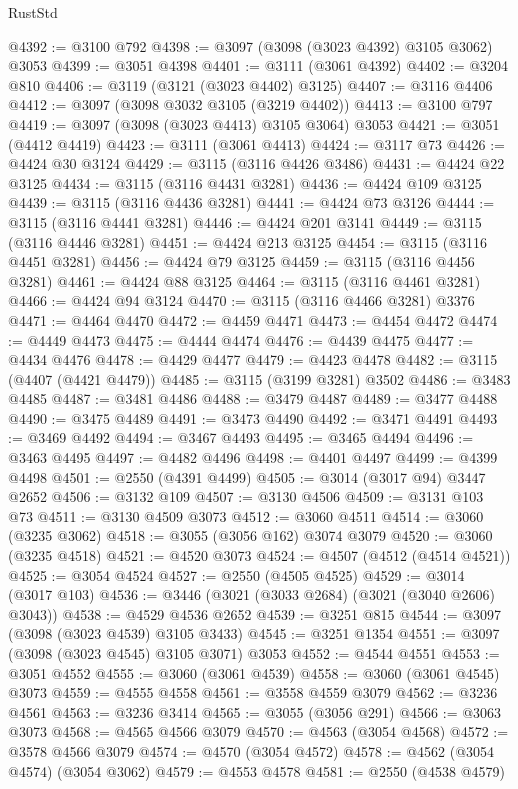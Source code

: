 \begin{lexlean}{RustStd}
\begin{coremodule}
{\begin{coremodule}
{{{{{{{{{{{{{{{{{{{{{{{{{{{{{{{{@4392 := @3100 @792
@4398 := @3097 (@3098 (@3023 @4392) @3105 @3062) @3053
@4399 := @3051 @4398
@4401 := @3111 (@3061 @4392)
@4402 := @3204 @810
@4406 := @3119 (@3121 (@3023 @4402) @3125)
@4407 := @3116 @4406
@4412 := @3097 (@3098 @3032 @3105 (@3219 @4402))
@4413 := @3100 @797
@4419 := @3097 (@3098 (@3023 @4413) @3105 @3064) @3053
@4421 := @3051 (@4412 @4419)
@4423 := @3111 (@3061 @4413)
@4424 := @3117 @73
@4426 := @4424 @30 @3124
@4429 := @3115 (@3116 @4426 @3486)
@4431 := @4424 @22 @3125
@4434 := @3115 (@3116 @4431 @3281)
@4436 := @4424 @109 @3125
@4439 := @3115 (@3116 @4436 @3281)
@4441 := @4424 @73 @3126
@4444 := @3115 (@3116 @4441 @3281)
@4446 := @4424 @201 @3141
@4449 := @3115 (@3116 @4446 @3281)
@4451 := @4424 @213 @3125
@4454 := @3115 (@3116 @4451 @3281)
@4456 := @4424 @79 @3125
@4459 := @3115 (@3116 @4456 @3281)
@4461 := @4424 @88 @3125
@4464 := @3115 (@3116 @4461 @3281)
@4466 := @4424 @94 @3124
@4470 := @3115 (@3116 @4466 @3281) @3376
@4471 := @4464 @4470
@4472 := @4459 @4471
@4473 := @4454 @4472
@4474 := @4449 @4473
@4475 := @4444 @4474
@4476 := @4439 @4475
@4477 := @4434 @4476
@4478 := @4429 @4477
@4479 := @4423 @4478
@4482 := @3115 (@4407 (@4421 @4479))
@4485 := @3115 (@3199 @3281) @3502
@4486 := @3483 @4485
@4487 := @3481 @4486
@4488 := @3479 @4487
@4489 := @3477 @4488
@4490 := @3475 @4489
@4491 := @3473 @4490
@4492 := @3471 @4491
@4493 := @3469 @4492
@4494 := @3467 @4493
@4495 := @3465 @4494
@4496 := @3463 @4495
@4497 := @4482 @4496
@4498 := @4401 @4497
@4499 := @4399 @4498
@4501 := @2550 (@4391 @4499)
@4505 := @3014 (@3017 @94) @3447 @2652
@4506 := @3132 @109
@4507 := @3130 @4506
@4509 := @3131 @103 @73
@4511 := @3130 @4509 @3073
@4512 := @3060 @4511
@4514 := @3060 (@3235 @3062)
@4518 := @3055 (@3056 @162) @3074 @3079
@4520 := @3060 (@3235 @4518)
@4521 := @4520 @3073
@4524 := @4507 (@4512 (@4514 @4521))
@4525 := @3054 @4524
@4527 := @2550 (@4505 @4525)
@4529 := @3014 (@3017 @103)
@4536 := @3446 (@3021 (@3033 @2684) (@3021 (@3040 @2606) @3043))
@4538 := @4529 @4536 @2652
@4539 := @3251 @815
@4544 := @3097 (@3098 (@3023 @4539) @3105 @3433)
@4545 := @3251 @1354
@4551 := @3097 (@3098 (@3023 @4545) @3105 @3071) @3053
@4552 := @4544 @4551
@4553 := @3051 @4552
@4555 := @3060 (@3061 @4539)
@4558 := @3060 (@3061 @4545) @3073
@4559 := @4555 @4558
@4561 := @3558 @4559 @3079
@4562 := @3236 @4561
@4563 := @3236 @3414
@4565 := @3055 (@3056 @291)
@4566 := @3063 @3073
@4568 := @4565 @4566 @3079
@4570 := @4563 (@3054 @4568)
@4572 := @3578 @4566 @3079
@4574 := @4570 (@3054 @4572)
@4578 := @4562 (@3054 @4574) (@3054 @3062)
@4579 := @4553 @4578
@4581 := @2550 (@4538 @4579)
}}}}}}}}}}}}}}}}}}}}}}}}}}}}}}}}
\end{coremodule}}
\end{coremodule}
\end{lexlean}
